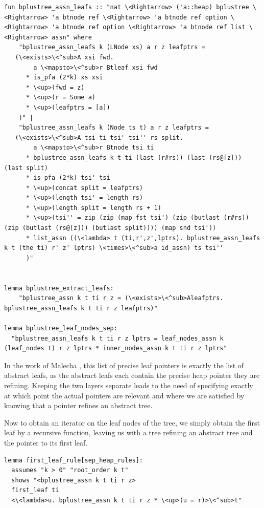 \documentclass[a4paper,UKenglish,cleveref, autoref, thm-restate]{lipics-v2021}
\begin{document}
\begin{lstlisting}[mathescape=true, language=Isabelle,label=lst:btree-view-split]
fun bplustree_assn_leafs :: "nat \<Rightarrow> ('a::heap) bplustree \<Rightarrow> 'a btnode ref \<Rightarrow> 'a btnode ref option \<Rightarrow> 'a btnode ref option \<Rightarrow> 'a btnode ref list \<Rightarrow> assn" where
    "bplustree_assn_leafs k (LNode xs) a r z leafptrs =
   (\<exists>\<^sub>A xsi fwd.
        a \<mapsto>\<^sub>r Btleaf xsi fwd
      * is_pfa (2*k) xs xsi
      * \<up>(fwd = z)
      * \<up>(r = Some a)
      * \<up>(leafptrs = [a])
    )" |
    "bplustree_assn_leafs k (Node ts t) a r z leafptrs =
   (\<exists>\<^sub>A tsi ti tsi' tsi'' rs split.
        a \<mapsto>\<^sub>r Btnode tsi ti
      * bplustree_assn_leafs k t ti (last (r#rs)) (last (rs@[z])) (last split)
      * is_pfa (2*k) tsi' tsi
      * \<up>(concat split = leafptrs)
      * \<up>(length tsi' = length rs)
      * \<up>(length split = length rs + 1)
      * \<up>(tsi'' = zip (zip (map fst tsi') (zip (butlast (r#rs)) (zip (butlast (rs@[z])) (butlast split)))) (map snd tsi'))
      * list_assn ((\<lambda> t (ti,r',z',lptrs). bplustree_assn_leafs k t (the ti) r' z' lptrs) \<times>\<^sub>a id_assn) ts tsi''
      )"


lemma bplustree_extract_leafs:
    "bplustree_assn k t ti r z = (\<exists>\<^sub>Aleafptrs. bplustree_assn_leafs k t ti r z leafptrs)"

lemma bplustree_leaf_nodes_sep:
  "bplustree_assn_leafs k t ti r z lptrs = leaf_nodes_assn k (leaf_nodes t) r z lptrs * inner_nodes_assn k t ti r z lptrs"
\end{lstlisting}

In the work of Malecha \cite{DBLP:conf/popl/MalechaMSW10}, 
this list of precise leaf pointers is exactly the list of abstract leafs,
as the abstract leafs each contain the precise heap pointer they are refining.
Keeping the two layers separate leads to the need of specifying
exactly at which point the actual pointers are relevant
and where we are satisfied by knowing that a pointer refines
an abstract tree.

Now to obtain an iterator on the leaf nodes of the tree,
we simply obtain the first leaf by a recursive function, leaving
us with a tree refining an abstract tree and the pointer to its first leaf.

\begin{lstlisting}[mathescape=true, language=Isabelle,label=lst:btree-first-leaf]
lemma first_leaf_rule[sep_heap_rules]:
  assumes "k > 0" "root_order k t"
  shows "<bplustree_assn k t ti r z>
  first_leaf ti
  <\<lambda>u. bplustree_assn k t ti r z * \<up>(u = r)>\<^sub>t"
\end{lstlisting}
\end{document}
